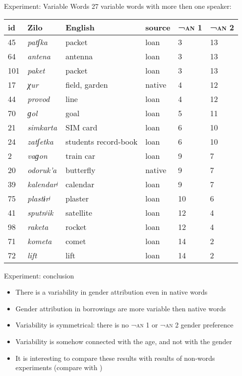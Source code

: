 \documentclass[13pt, t]{beamer}
\begin{document}
\begin{frame}{Experiment: Variable Words}
27 variable words with more then one speaker: \bigskip\\

\small
\begin{tabular}{|l|l|l|l|l|l|}
\hline
id & Zilo & English & source & \textsc{¬an} 1 & \textsc{¬an} 2 \\ \hline
45 & \textit{patʃka} & packet & loan & 3 & 13 \\ \hline
64 & \textit{antena} & antenna & loan & 3 & 13 \\ \hline
101 & \textit{paket} & packet & loan & 3 & 13 \\ \hline
17 & \textit{χur} & field, garden & native & 4 & 12 \\ \hline
44 & \textit{provod} & line & loan & 4 & 12 \\ \hline
70 & \textit{ɡol} & goal & loan & 5 & 11 \\ \hline
21 & \textit{simkarta} & SIM card& loan & 6 & 10 \\ \hline
24 & \textit{zatʃetka} & students record-book & loan & 6 & 10 \\ \hline
2 & \textit{vaɡon} & train car & loan & 9 & 7 \\ \hline
20 & \textit{odoruk'a} & butterfly & native & 9 & 7 \\ \hline
39 & \textit{kalendarʲ} & calendar & loan & 9 & 7 \\ \hline
75 & \textit{plastɨrʲ} & plaster & loan & 10 & 6 \\ \hline
41 & \textit{sputnʲik} & satellite & loan & 12 & 4 \\ \hline
98 & \textit{raketa} & rocket & loan & 12 & 4 \\ \hline
71 & \textit{kometa} & comet & loan & 14 & 2 \\ \hline
72 & \textit{lift} & lift & loan & 14 & 2 \\ \hline
\end{tabular}
\end{frame}


\begin{frame}{Experiment: conclusion}
\begin{itemize}
\item There is a variability in gender attribution even in native words
\item Gender attribution in borrowings are more variable then native words
\item Variability is symmetrical: there is no \textsc{¬an} 1 or \textsc{¬an} 2 gender preference
\item Variability is somehow connected with the age, and not with the gender \pause
\item It is interesting to compare these results with results of non-words experiments (compare with \citep{dabrowska05})
\end{itemize}
\end{frame}
\end{document}
